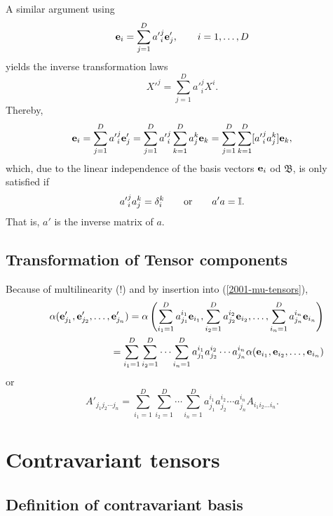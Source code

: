 A similar argument using
\begin{equation}
{\bf e}_i=\sum_{j=1}^D {a'}_i^j {\bf e}'_j, \qquad i=1,\ldots , D
\end{equation}
yields the inverse transformation laws
\begin{equation}
{X'}^j   = \sum_{j=1}^D {a'}_i^j{X}^i.
\end{equation}
Thereby,
\begin{equation}
{\bf e}_i=\sum_{j=1}^D {a'}_i^j {\bf e}'_j
=\sum_{j=1}^D {a'}_i^j \sum_{k=1}^D a_j^k {\bf e}_k
=\sum_{j=1}^D \sum_{k=1}^D [{a'}_i^j a_j^k] {\bf e}_k,
\end{equation}
which, due to the linear independence of the basis vectors ${\bf e}_i$ od ${\mathfrak B}$,
is only satisfied if
\begin{equation}
{a'}_i^j a_j^k =\delta_i^k
\qquad
{\rm or}
\qquad
a'a={\Bbb I}.
\end{equation}
That is, $a'$ is the inverse matrix of $a$.

\subsection{Transformation of Tensor components}

Because of multilinearity (!) and by insertion into
(\ref{2001-mu-tensors}),
\begin{eqnarray}
&&\alpha ( {\bf e}'_{j_1},{\bf e}'_{j_2},\ldots ,{\bf e}'_{j_n})=
\alpha \left(
\sum_{i_1=1}^D a_{j_1}^{i_1} {\bf e}_{i_1},
\sum_{i_2=1}^D a_{j_2}^{i_2} {\bf e}_{i_2},
\ldots ,
\sum_{i_n=1}^D a_{j_n}^{i_n} {\bf e}_{i_n}
\right)
\nonumber \\&& \quad
=
\sum_{i_1=1}^D\sum_{i_2=1}^D\cdots \sum_{i_n=1}^D
a_{j_1}^{i_1}a_{j_2}^{i_2}\cdots a_{j_n}^{i_n} \alpha ( {\bf e}_{i_1},{\bf e}_{i_2},\ldots ,{\bf e}_{i_n})
\end{eqnarray}
or
\begin{equation}
A'_{{j_1}{j_2}\cdots {j_n}}=
\sum_{i_1=1}^D\sum_{i_2=1}^D\cdots \sum_{i_n=1}^D
a_{j_1}^{i_1}a_{j_2}^{i_2}\cdots a_{j_n}^{i_n} A_{i_1 i_2\ldots i_n}.
\end{equation}


\section{Contravariant tensors}

\subsection{Definition of contravariant basis}

